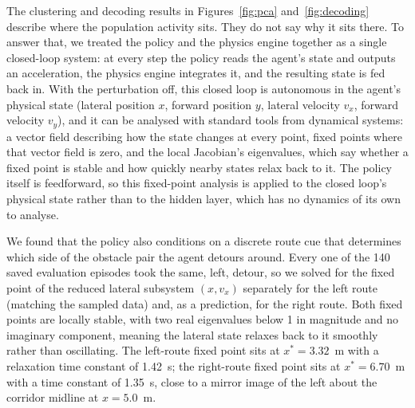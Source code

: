 \documentclass{article}
\begin{document}
The clustering and decoding results in Figures~\ref{fig:pca}
and~\ref{fig:decoding} describe where the population activity sits.
They do not say why it sits there.
To answer that, we treated the policy and the physics engine together as
a single closed-loop system: at every step the policy reads the agent's
state and outputs an acceleration, the physics engine integrates it, and
the resulting state is fed back in.
With the perturbation off, this closed loop is autonomous in the agent's
physical state (lateral position $x$, forward position $y$, lateral
velocity $v_x$, forward velocity $v_y$), and it can be analysed with
standard tools from dynamical systems: a vector field describing how the
state changes at every point, fixed points where that vector field is
zero, and the local Jacobian's eigenvalues, which say whether a fixed
point is stable and how quickly nearby states relax back to it.
The policy itself is feedforward, so this fixed-point analysis is applied
to the closed loop's physical state rather than to the hidden layer,
which has no dynamics of its own to analyse.

We found that the policy also conditions on a discrete route cue that
determines which side of the obstacle pair the agent detours around.
Every one of the 140 saved evaluation episodes took the same, left,
detour, so we solved for the fixed point of the reduced lateral subsystem
$(x, v_x)$ separately for the left route (matching the sampled data) and,
as a prediction, for the right route.
Both fixed points are locally stable, with two real eigenvalues below 1 in
magnitude and no imaginary component, meaning the lateral state relaxes
back to it smoothly rather than oscillating.
The left-route fixed point sits at $x^{*}=3.32$~m with a relaxation time
constant of 1.42~s; the right-route fixed point sits at $x^{*}=6.70$~m
with a time constant of 1.35~s, close to a mirror image of the left about
the corridor midline at $x=5.0$~m.
\end{document}
